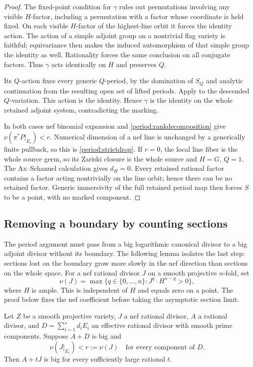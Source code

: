 \begin{proof}
The fixed-point condition for $\gamma$ rules out permutations
involving any visible $H$-factor, including a permutation
with a factor whose coordinate is held fixed.  On each visible
$H$-factor of the highest-line orbit it forces the identity action.
The action of a simple adjoint group on a nontrivial flag variety is faithful;
equivariance then makes the induced automorphism of that
simple group the identity as well.  Rationality forces the
same conclusion on all conjugate factors.  Thus $\gamma$
acts identically on $H$ and preserves $Q$.

Its $Q$-action fixes every generic $Q$-period, by the domination
of $S_Q$ and analytic continuation from the resulting open set of
lifted periods. Apply  to the descended
$Q$-variation.  This action is the identity.  Hence $\gamma$
is the identity on the whole retained adjoint system,
contradicting the marking.

In both cases nef binomial expansion and
\eqref{period:rankdecomposition} give
$\nu(\pi^*P|_{E_i})<r$.  Numerical dimension of a nef line is
unchanged by a generically finite pullback, so this is
\eqref{period:strictdrop}.  If $r=0$, the local line fiber is the whole source germ, so its
Zariski closure is the whole source and $H=G$, $Q=1$.  The
Ax--Schanuel calculation gives $d_H=0$.  Every retained rational
factor contains a factor acting nontrivially on the line orbit;
hence there can be no retained factor.  Generic immersivity of the
full retained period map then forces $S$ to be a point, with no
marked component.
\end{proof}

\subsection{Removing a boundary by counting sections}

The period argument must pass from a big logarithmic canonical
divisor to a big adjoint divisor without its boundary. The following
lemma isolates the last step: sections lost on the boundary grow
more slowly in the nef direction than sections on the whole space.
For a nef rational divisor $J$ on a smooth projective $n$-fold, set
\[
 \nu(J)=\max\{q\in\{0,\ldots,n\}:J^q\cdot H^{n-q}>0\},
\]
where $H$ is ample. This is independent of $H$ and equals zero
on a point. The proof below fixes the nef coefficient before
taking the asymptotic section limit.

\begin{lemma}\label{period:subtract}
Let $Z$ be a smooth projective variety, $J$ a nef rational divisor,
$A$ a rational divisor, and
$D=\sum_{i=1}^s d_iE_i$ an effective rational divisor with smooth
prime components. Suppose $A+D$ is big and
\[
 \nu(J|_{E_i})<r:=\nu(J)
 \quad\text{for every component of }D.
\]
Then $A+tJ$ is big for every sufficiently large rational $t$.
\end{lemma}

